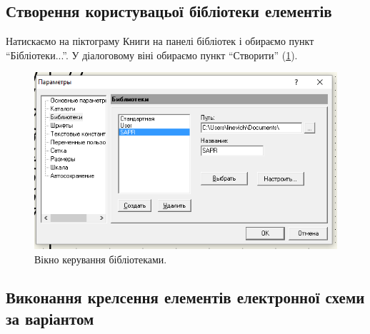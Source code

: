 \FloatBarrier
\subsection{Створення користувацьої бібліотеки елементів}

Натискаємо на піктограму Книги на панелі бібліотек і обираємо пункт ``Бібліотеки...''. У діалоговому
віні обираємо пункт ``Створити'' (\ref{fig:lab2:create_library}).
\begin{figure}[!htb]
  \centering \includegraphics[width=0.9\linewidth]{./images/lab2/new_library.png}
  \caption{Вікно керування бібліотеками.}
  \label{fig:lab2:create_library}
\end{figure}
\FloatBarrier

\subsection{Виконання крелсення елементів електронної схеми за варіантом}

